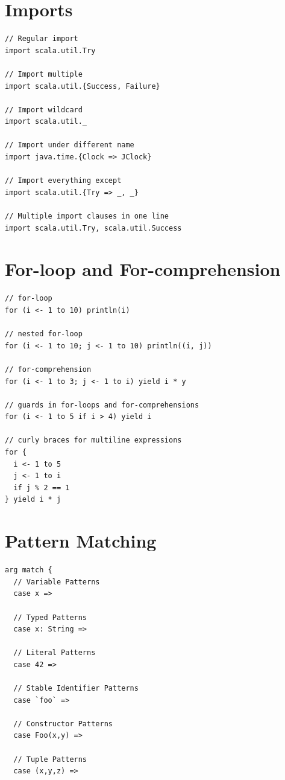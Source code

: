 \documentclass[10pt,landscape,a4paper]{article}
\begin{document}
\begin{multicols*}{4}
    \section{Imports}

\begin{verbatim}
// Regular import
import scala.util.Try

// Import multiple
import scala.util.{Success, Failure}

// Import wildcard
import scala.util._

// Import under different name
import java.time.{Clock => JClock}

// Import everything except
import scala.util.{Try => _, _}

// Multiple import clauses in one line
import scala.util.Try, scala.util.Success
\end{verbatim}

  \section{For-loop and For-comprehension}

\begin{verbatim}
// for-loop
for (i <- 1 to 10) println(i)

// nested for-loop
for (i <- 1 to 10; j <- 1 to 10) println((i, j))

// for-comprehension
for (i <- 1 to 3; j <- 1 to i) yield i * y

// guards in for-loops and for-comprehensions
for (i <- 1 to 5 if i > 4) yield i

// curly braces for multiline expressions
for {
  i <- 1 to 5
  j <- 1 to i
  if j % 2 == 1
} yield i * j
\end{verbatim}
  \section{Pattern Matching}

\begin{verbatim}
arg match {
  // Variable Patterns
  case x =>

  // Typed Patterns
  case x: String =>

  // Literal Patterns
  case 42 =>

  // Stable Identifier Patterns
  case `foo` =>

  // Constructor Patterns
  case Foo(x,y) =>

  // Tuple Patterns
  case (x,y,z) =>


\end{verbatim}
\end{multicols*}
\end{document}

